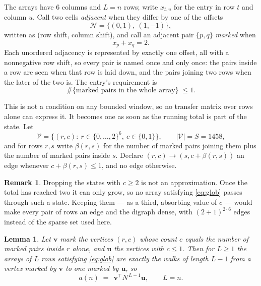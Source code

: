 \documentclass[11pt,a4paper]{article}
\theoremstyle{plain}
\newtheorem{lemma}[theorem]{Lemma}
\theoremstyle{definition}
\newtheorem{remark}[theorem]{Remark}
\begin{document}
The arrays have $6$ columns and $L=n$ rows; write $x_{t,u}$ for the entry in
row $t$ and column $u$. Call two cells \emph{adjacent} when they differ by one of the
offsets
\[
\mathcal N=\{(0,1),\ (1,-1)\},
\]
written as (row shift, column shift), and call an adjacent pair $\{p,q\}$
\emph{marked} when
\[
x_{p}+x_{q}=2 .
\]
Each unordered adjacency is represented by exactly one offset, all with a nonnegative row
shift, so every pair is named once and only once: the pairs inside a row are seen when
that row is laid down, and the pairs joining two rows when the later of the two is. The
entry's requirement is
\begin{equation}\label{eq:glob}
\#\{\text{marked pairs in the whole array}\}\;\le1.
\end{equation}

This is not a condition on any bounded window, so no transfer matrix over rows alone can
express it. It becomes one as soon as the running total is part of the state. Let
\[
\mathcal V=\bigl\{(r,c):\ r\in\{0,\dots,2\}^{6},\ c\in\{0,1\}\bigr\},
\qquad |\mathcal V|=S=1458,
\]
and for rows $r,s$ write $\beta(r,s)$ for the number of marked pairs joining them plus the
number of marked pairs inside $s$. Declare $(r,c)\to(s,c+\beta(r,s))$ an edge whenever
$c+\beta(r,s)\le1$, and no edge otherwise.

\begin{remark}
Dropping the states with $c\ge2$ is not an approximation. Once the total has reached two it
can only grow, so no array satisfying \eqref{eq:glob} passes through such a state. Keeping
them --- as a third, absorbing value of $c$ --- would make every pair of rows an edge and
the digraph dense, with $(2+1)^{2\cdot6}$ edges instead of the sparse set used here.
\end{remark}

\begin{lemma}\label{lem:walk}
Let $\mathbf{v}$ mark the vertices $(r,c)$ whose count $c$ equals the number of marked pairs
inside $r$ alone, and $\mathbf{u}$ the vertices with $c\le1$. Then for $L\ge1$ the arrays
of $L$ rows satisfying \eqref{eq:glob} are exactly the walks of length $L-1$ from a
vertex marked by $\mathbf{v}$ to one marked by $\mathbf{u}$, so
\[
a(n)\;=\;\,\mathbf{v}^{\!\top}N^{\,L-1}\mathbf{u},\qquad L=n .
\]
\end{lemma}
\end{document}
